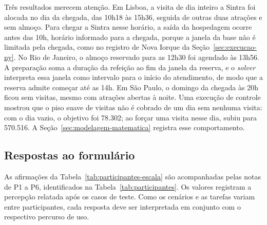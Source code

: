 Três resultados merecem atenção. Em Lisboa, a visita de dia inteiro a Sintra foi alocada no dia da chegada, das 10h18 às 15h36, seguida de outras duas atrações e sem almoço. Para chegar a Sintra nesse horário, a saída da hospedagem ocorre antes das 10h, horário informado para a chegada, porque a janela da base não é limitada pela chegada, como no registro de Nova Iorque da Seção~\ref{sec:execucao-ny}. No Rio de Janeiro, o almoço reservado para as 12h30 foi agendado às 13h56. A preparação soma a duração da refeição ao fim da janela da reserva, e o \textit{solver} interpreta essa janela como intervalo para o início do atendimento, de modo que a reserva admite começar até as 14h. Em São Paulo, o domingo da chegada às 20h ficou sem visitas, mesmo com atrações abertas à noite. Uma execução de controle mostrou que o piso suave de visitas não é cobrado de um dia sem nenhuma visita: com o dia vazio, o objetivo foi 78.302; ao forçar uma visita nesse dia, subiu para 570.516. A Seção~\ref{sec:modelagem-matematica} registra esse comportamento.

\subsection{Respostas ao formulário}
\label{sec:respostas-formulario}

As afirmações da Tabela~\ref{tab:participantes-escala} são acompanhadas pelas notas de P1 a P6, identificados na Tabela~\ref{tab:participantes}. Os valores registram a percepção relatada após os casos de teste. Como os cenários e as tarefas variam entre participantes, cada resposta deve ser interpretada em conjunto com o respectivo percurso de uso.

